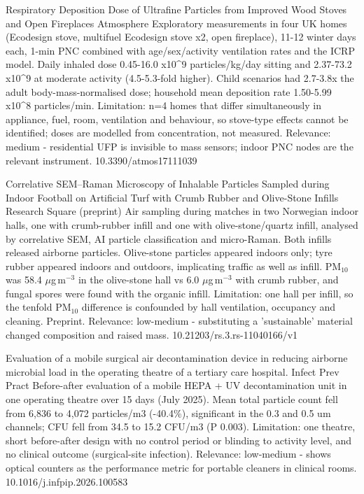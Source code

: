 \documentclass[10pt]{article}
\begin{document}
{Respiratory Deposition Dose of Ultrafine Particles from Improved Wood Stoves and Open Fireplaces}
{Atmosphere}
{Exploratory measurements in four UK homes (Ecodesign stove, multifuel Ecodesign stove x2, open fireplace), 11-12 winter days each, 1-min PNC combined with age/sex/activity ventilation rates and the ICRP model. Daily inhaled dose 0.45-16.0 x10\textasciicircum{}9 particles/kg/day sitting and 2.37-73.2 x10\textasciicircum{}9 at moderate activity (4.5-5.3-fold higher). Child scenarios had 2.7-3.8x the adult body-mass-normalised dose; household mean deposition rate 1.50-5.99 x10\textasciicircum{}8 particles/min. Limitation: n=4 homes that differ simultaneously in appliance, fuel, room, ventilation and behaviour, so stove-type effects cannot be identified; doses are modelled from concentration, not measured. Relevance: medium - residential UFP is invisible to mass sensors; indoor PNC nodes are the relevant instrument.}
{10.3390/atmos17111039}

{Correlative SEM–Raman Microscopy of Inhalable Particles Sampled during Indoor Football on Artificial Turf with Crumb Rubber and Olive-Stone Infills}
{Research Square (preprint)}
{Air sampling during matches in two Norwegian indoor halls, one with crumb-rubber infill and one with olive-stone/quartz infill, analysed by correlative SEM, AI particle classification and micro-Raman. Both infills released airborne particles. Olive-stone particles appeared indoors only; tyre rubber appeared indoors and outdoors, implicating traffic as well as infill. PM$_{10}$ was 58.4 $\mu$g\,m$^{-3}$ in the olive-stone hall vs 6.0 $\mu$g\,m$^{-3}$ with crumb rubber, and fungal spores were found with the organic infill. Limitation: one hall per infill, so the tenfold PM$_{10}$ difference is confounded by hall ventilation, occupancy and cleaning. Preprint. Relevance: low-medium - substituting a 'sustainable' material changed composition and raised mass.}
{10.21203/rs.3.rs-11040166/v1}

{Evaluation of a mobile surgical air decontamination device in reducing airborne microbial load in the operating theatre of a tertiary care hospital.}
{Infect Prev Pract}
{Before-after evaluation of a mobile HEPA + UV decontamination unit in one operating theatre over 15 days (July 2025). Mean total particle count fell from 6,836 to 4,072 particles/m3 (-40.4\%), significant in the 0.3 and 0.5 um channels; CFU fell from 34.5 to 15.2 CFU/m3 (P 0.003). Limitation: one theatre, short before-after design with no control period or blinding to activity level, and no clinical outcome (surgical-site infection). Relevance: low-medium - shows optical counters as the performance metric for portable cleaners in clinical rooms.}
{10.1016/j.infpip.2026.100583}
\end{document}
